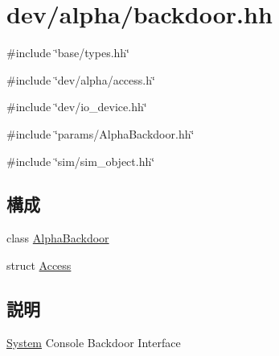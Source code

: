 \hypertarget{backdoor_8hh}{
\section{dev/alpha/backdoor.hh}
\label{backdoor_8hh}
}
{\ttfamily \#include \char`\"{}base/types.hh\char`\"{}}\par
{\ttfamily \#include \char`\"{}dev/alpha/access.h\char`\"{}}\par
{\ttfamily \#include \char`\"{}dev/io\_\-device.hh\char`\"{}}\par
{\ttfamily \#include \char`\"{}params/AlphaBackdoor.hh\char`\"{}}\par
{\ttfamily \#include \char`\"{}sim/sim\_\-object.hh\char`\"{}}\par
\subsection*{構成}
\begin{DoxyCompactItemize}
\item 
class \hyperlink{classAlphaBackdoor}{AlphaBackdoor}
\item 
struct \hyperlink{structAlphaBackdoor_1_1Access}{Access}
\end{DoxyCompactItemize}


\subsection{説明}
\hyperlink{classSystem}{System} Console Backdoor Interface 